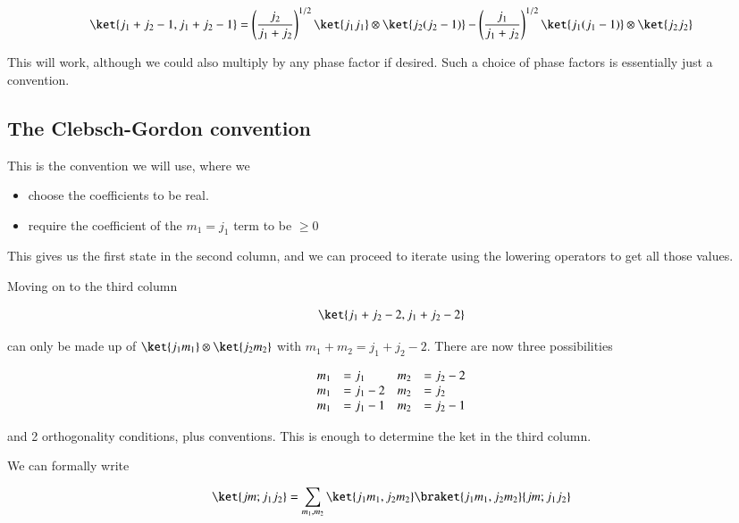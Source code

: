 \begin{equation}\label{eqn:qmTwoL18:110}
\ket{j_1 + j_2 - 1, j_1 + j_2 -1} 
=
\left(\frac{j_2}{j_1 + j_2}\right)^{1/2}
\ket{j_1 j_1} \otimes \ket{j_2 (j_2-1)}
-
\left(\frac{j_1}{j_1 + j_2}\right)^{1/2}
\ket{j_1 (j_1-1)} \otimes \ket{j_2 j_2}
\end{equation}

This will work, although we could also multiply by any phase factor if desired.  Such a choice of phase factors is essentially just a convention.

\subsection{The Clebsch-Gordon convention}

This is the convention we will use, where we

\begin{itemize}
\item choose the coefficients to be real.
\item require the coefficient of the $m_1 = j_1$ term to be $\ge 0$
\end{itemize}

This gives us the first state in the second column, and we can proceed to iterate using the lowering operators to get all those values.

Moving on to the third column

\begin{equation}\label{eqn:qmTwoL18:130}
\ket{j_1 + j_2 - 2, j_1 + j_2 -2} 
\end{equation}

can only be made up of $\ket{j_1 m_1} \otimes \ket{j_2 m_2}$ with $m_1 + m_2 = j_1 + j_2 -2$.  There are now three possibilities

\begin{equation}\label{eqn:qmTwoL18:150}
\begin{array}{l l l l}
m_1 &= j_1	 &  m_2 &= j_2 - 2 \\
m_1 &= j_1 - 2  &  m_2 &= j_2 \\
m_1 &= j_1 - 1  &  m_2 &= j_2 - 1
\end{array}
\end{equation}

and 2 orthogonality conditions, plus conventions.  This is enough to determine the ket in the third column.

We can formally write

\begin{equation}\label{eqn:qmTwoL18:170}
\ket{jm ; j_1 j_2} = 
\sum_{m_1, m_2}
\ket{ j_1 m_1, j_2 m_2}
\braket{ j_1 m_1, j_2 m_2}{jm ; j_1 j_2} 
\end{equation}

